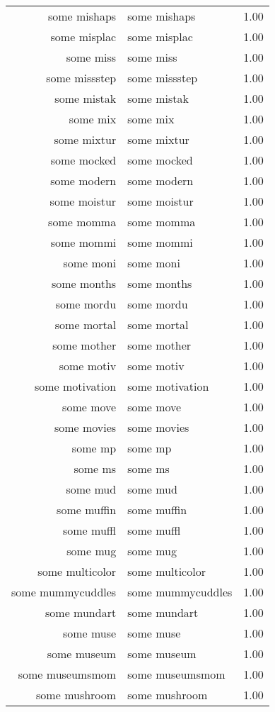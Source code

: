 \begin{table}[ht]
\begin{tabular}{rlr}
  some mishaps & some mishaps & 1.00 \\ 
  some misplac & some misplac & 1.00 \\ 
  some miss & some miss & 1.00 \\ 
  some missstep & some missstep & 1.00 \\ 
  some mistak & some mistak & 1.00 \\ 
  some mix & some mix & 1.00 \\ 
  some mixtur & some mixtur & 1.00 \\ 
  some mocked & some mocked & 1.00 \\ 
  some modern & some modern & 1.00 \\ 
  some moistur & some moistur & 1.00 \\ 
  some momma & some momma & 1.00 \\ 
  some mommi & some mommi & 1.00 \\ 
  some moni & some moni & 1.00 \\ 
  some months & some months & 1.00 \\ 
  some mordu & some mordu & 1.00 \\ 
  some mortal & some mortal & 1.00 \\ 
  some mother & some mother & 1.00 \\ 
  some motiv & some motiv & 1.00 \\ 
  some motivation & some motivation & 1.00 \\ 
  some move & some move & 1.00 \\ 
  some movies & some movies & 1.00 \\ 
  some mp & some mp & 1.00 \\ 
  some ms & some ms & 1.00 \\ 
  some mud & some mud & 1.00 \\ 
  some muffin & some muffin & 1.00 \\ 
  some muffl & some muffl & 1.00 \\ 
  some mug & some mug & 1.00 \\ 
  some multicolor & some multicolor & 1.00 \\ 
  some mummycuddles & some mummycuddles & 1.00 \\ 
  some mundart & some mundart & 1.00 \\ 
  some muse & some muse & 1.00 \\ 
  some museum & some museum & 1.00 \\ 
  some museumsmom & some museumsmom & 1.00 \\ 
  some mushroom & some mushroom & 1.00 \\ 

\end{tabular}
\end{table}

